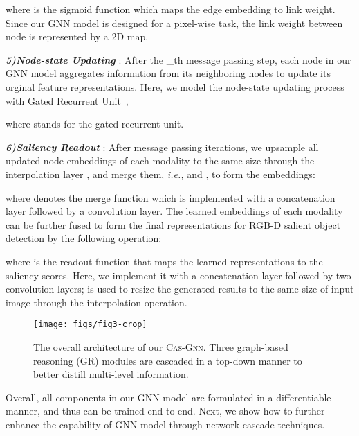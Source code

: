 \documentclass[runningheads]{llncs}
\begin{document}
\noindent where  is the sigmoid function which maps the edge embedding to link weight. Since our GNN model is designed for a pixel-wise task, the link weight between node is represented by a 2D map.

\noindent \emph{\textbf{\footnotesize 5)Node-state Updating }}: 
After the \_th message passing step, each node  in our GNN model aggregates information from its neighboring nodes to update its orginal feature representations. Here, we model the node-state updating process with Gated Recurrent Unit~\cite{ballas2015delving}, 


\noindent where  stands for the gated recurrent unit.

\noindent \emph{\textbf{\footnotesize 6)Saliency Readout }}: After  message passing iterations, we upsample all updated node embeddings of each modality to the same size through the interpolation layer , and merge them, \emph{i.e.,}  and , to form the embeddings:


\noindent where  denotes the merge function which is implemented with a concatenation layer followed by a  convolution layer. The learned embeddings of each modality can be further fused to form the final representations for RGB-D salient object detection by the following operation:


\noindent where  is the readout function that maps the learned representations to the saliency scores. Here, we implement it with a concatenation layer followed by two  convolution layers;  is used to resize the generated results to the same size of input image  through the interpolation operation. 

	\begin{figure*}[pt]
	\begin{center}
		\texttt{[image: figs/fig3-crop]}
	\end{center}
	\caption{The overall architecture of our {\scshape{Cas-Gnn}}. Three graph-based reasoning (GR) modules are cascaded in a top-down manner to better distill multi-level information.}
	\label{fig:3}
\end{figure*}

Overall, all components in our GNN model are formulated in a differentiable manner, and thus can be trained end-to-end. Next, we show how to further enhance the capability of GNN model through network cascade techniques. 
\end{document}

